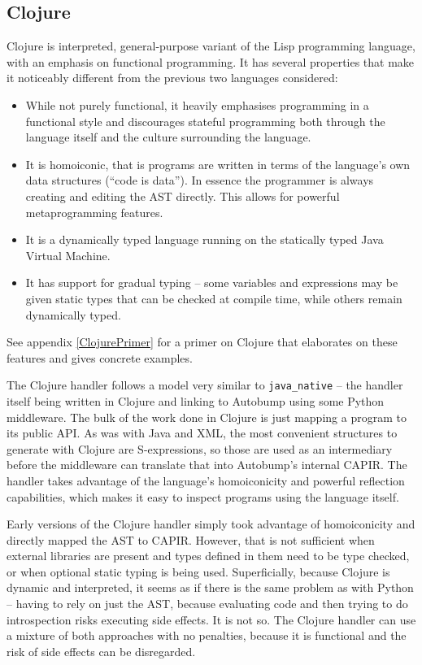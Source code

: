 \documentclass{l4proj}
\newcommand\genericstyle{\lstset{basicstyle=\ttm}}
\newcommand\codeinline[1]{{\genericstyle\lstinline!#1!}}
\begin{document}
\subsection{Clojure}
\label{Clojure}

Clojure is interpreted, general-purpose variant of the Lisp
programming language, with an emphasis on functional programming. It
has several properties that make it noticeably different from the
previous two languages considered:

\begin{itemize}
\item While not purely functional, it heavily emphasises programming
in a functional style and discourages stateful programming both through the
language itself and the culture surrounding the language.
\item It is homoiconic, that is programs are written in terms of the
language's own data structures (``code is data''). In essence the
programmer is always creating and editing the AST directly. This
allows for powerful metaprogramming features.
\item It is a dynamically typed language running on the statically
typed Java Virtual Machine.
\item It has support for gradual typing --
some variables and expressions may be given static types that can be
checked at compile time, while others remain dynamically typed.
\end{itemize}

See appendix \ref{ClojurePrimer} for a primer on Clojure that
elaborates on these features and gives concrete examples.

The Clojure handler follows a model very similar to \codeinline{java_native}
-- the handler itself being written in Clojure and linking to Autobump
using some Python middleware. The bulk of the work done in Clojure is
just mapping a program to its public API. As was with Java and XML,
the most convenient structures to generate with Clojure are
S-expressions, so those are used as an intermediary before the
middleware can translate that into Autobump's internal CAPIR. The
handler takes advantage of the language's homoiconicity and powerful
reflection capabilities, which makes it easy to inspect programs using
the language itself.

Early versions of the Clojure handler simply took advantage of
homoiconicity and directly mapped the AST to CAPIR. However, that is
not sufficient when external libraries are present and types defined
in them need to be type checked, or when optional static typing is being used.
Superficially, because Clojure is dynamic and interpreted, it seems as
if there is the same problem as with Python -- having to
rely on just the AST, because evaluating code and then trying to do
introspection risks executing side effects. It is not so. The Clojure
handler can use a mixture of both approaches with no penalties,
because it is functional and the risk of side effects can be disregarded.
\end{document}
